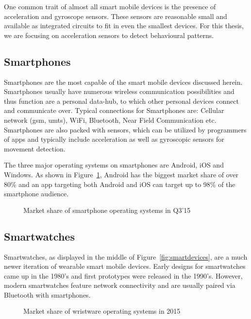 One common trait of almost all smart mobile devices is the presence of acceleration and gyroscope sensors. These sensors are reasonable small and available as integrated circuits to fit in even the smallest devices. For this thesis, we are focusing on acceleration sensors to detect behavioural patterns.

\subsection{Smartphones}
Smartphones are the most capable of the smart mobile devices discussed herein. Smartphones usually have numerous wireless communication possibilities and thus function are a personal data-hub, to which other personal devices connect and communicate over. Typical connections for Smartphones are: Cellular network (\eg \acrshort{gsm}, \acrshort{umts}), WiFi, Bluetooth, Near Field Communication etc. Smartphones are also packed with sensors, which can be utilized by programmers of \glspl{app} and typically include acceleration as well as gyroscopic sensors for movement detection.

The three major operating systems on smartphones are Android, iOS and Windows. As shown in Figure~\ref{fig:smartphoneosmarketshare}, Android has the biggest market share of over 80\% and an \gls{app} targeting both Android and iOS can target up to 98\% of the smartphone audience.

\begin{figure}
    \centering
    
    \caption{Market share of smartphone operating systems in Q3'15\cite{gartner2015smartosmarketshare}}
    \label{fig:smartphoneosmarketshare}
\end{figure}

\subsection{Smartwatches}
Smartwatches, as displayed in the middle of Figure~\ref{fig:smartdevices}, are a much newer iteration of wearable smart mobile devices. Early designs for smartwatches came up in the 1980's and first prototypes were released in the 1990's. However, modern smartwatches feature network connectivity and are usually paired via Bluetooth with smartphones.

\begin{figure}
    \centering
    
    \caption{Market share of wristware operating systems in 2015\cite{idc2015wristmarketshare}}
    \label{fig:my_label}
\end{figure}

